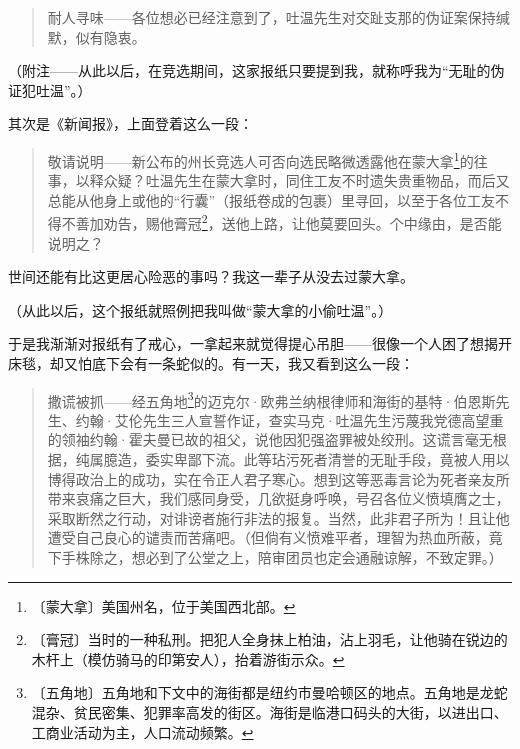 \documentclass[12pt,UTF-8,openany]{ctexbook}
\begin{document}
\begin{normalsize}
    \begin{quotation}
    
    耐人寻味——各位想必已经注意到了，吐温先生对交趾支那的伪证案保持缄默，似有隐衷。
    
    \end{quotation}
    
    （附注——从此以后，在竞选期间，这家报纸只要提到我，就称呼我为“无耻的伪证犯吐温”。）
    
    其次是《新闻报》，上面登着这么一段：
    
    \begin{quotation}
    
    敬请说明——新公布的州长竞选人可否向选民略微透露他在蒙大拿\footnote{〔蒙大拿〕美国州名，位于美国西北部。}的往事，以释众疑？吐温先生在蒙大拿时，同住工友不时遗失贵重物品，而后又总能从他身上或他的“行囊”（报纸卷成的包裹）里寻回，以至于各位工友不得不善加劝告，赐他膏冠\footnote{〔膏冠〕当时的一种私刑。把犯人全身抹上柏油，沾上羽毛，让他骑在锐边的木杆上（模仿骑马的印第安人），抬着游街示众。}，送他上路，让他莫要回头。个中缘由，是否能说明之？
    
    \end{quotation}
    
    世间还能有比这更居心险恶的事吗？我这一辈子从没去过蒙大拿。
    
    （从此以后，这个报纸就照例把我叫做“蒙大拿的小偷吐温”。）
    
    于是我渐渐对报纸有了戒心，一拿起来就觉得提心吊胆——很像一个人困了想揭开床毯，却又怕底下会有一条蛇似的。有一天，我又看到这么一段：
    
    \begin{quotation}
    
    撒谎被抓——经五角地\footnote{〔五角地〕五角地和下文中的海街都是纽约市曼哈顿区的地点。五角地是龙蛇混杂、贫民密集、犯罪率高发的街区。海街是临港口码头的大街，以进出口、工商业活动为主，人口流动频繁。}的迈克尔·欧弗兰纳根律师和海街的基特·伯恩斯先生、约翰·艾伦先生三人宣誓作证，查实马克·吐温先生污蔑我党德高望重的领袖约翰·霍夫曼已故的祖父，说他因犯强盗罪被处绞刑。这谎言毫无根据，纯属臆造，委实卑鄙下流。此等玷污死者清誉的无耻手段，竟被人用以博得政治上的成功，实在令正人君子寒心。想到这等恶毒言论为死者亲友所带来哀痛之巨大，我们感同身受，几欲挺身呼唤，号召各位义愤填膺之士，采取断然之行动，对诽谤者施行非法的报复。当然，此非君子所为！且让他遭受自己良心的谴责而苦痛吧。（但倘有义愤难平者，理智为热血所蔽，竟下手株除之，想必到了公堂之上，陪审团员也定会通融谅解，不致定罪。）
    
    \end{quotation}
    

\end{normalsize}
\end{document}
